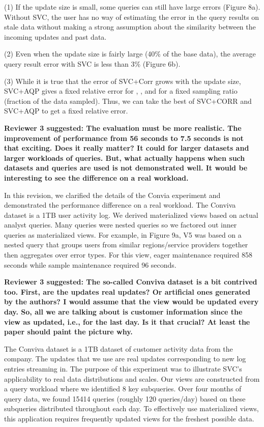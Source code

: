 \noindent  (1) If the update size is small, some queries can still have large errors (Figure 8a). Without SVC, the user has no way of estimating the error in the query results on stale data without making a strong assumption about the similarity between the incoming updates and past data. 

\noindent (2) Even when the update size is fairly large (40\% of the base data), the average query result error with SVC is less than 3\% (Figure 6b).

\noindent (3) While it is true that the error of SVC+Corr grows with the update size, SVC+AQP gives a fixed relative error for \sumfunc, \countfunc, and \avgfunc for a fixed sampling ratio (fraction of the data sampled). Thus, we can take the best of SVC+CORR and SVC+AQP to get a fixed relative error. 


\vspace{1.5em}

\textbf{Reviewer 3 suggested: The evaluation must be more realistic. The improvement of performance from 56 seconds to 7.5 seconds is not that exciting. Does it really matter? It could for larger datasets and larger workloads of queries. But, what actually happens when such datasets and queries are used is not demonstrated well. It would be interesting to see the difference on a real workload.}


In this revision, we clarified the details of the Convia experiment and demonstrated the performance difference on a real workload. The Conviva dataset is a 1TB user activity log. We derived materialized views based on actual analyst queries. Many queries were nested queries so we factored out inner queries as materialized views. For example, in Figure 9a, V5 was based on a nested query that groups users from similar regions/service providers together then aggregates over error types. For this view, eager maintenance required 858 seconds while sample maintenance required 96 seconds. 

\vspace{1.5em}

\textbf{Reviewer 3 suggested: The so-called Conviva dataset is a bit contrived too. First, are the updates real updates? Or artificial ones generated by the authors? I would assume that the view would be updated every day. So, all we are talking about is customer information since the view as updated, i.e., for the last day. Is it that crucial? At least the paper should paint the picture why.}

The Conviva dataset is a 1TB dataset of customer activity data from the company. The updates that we use are real updates corresponding to new log entries streaming in. %
The purpose of this experiment was to illustrate SVC's applicability to real data distributions and scales. 
Our views are constructed from a query workload where we identified 8 key subqueries.
Over four months of query data, we found 15414 queries (roughly 120 queries/day) based on these subqueries distributed throughout each day. 
To effectively use materialized views, this application requires frequently updated views for the freshest possible data.

